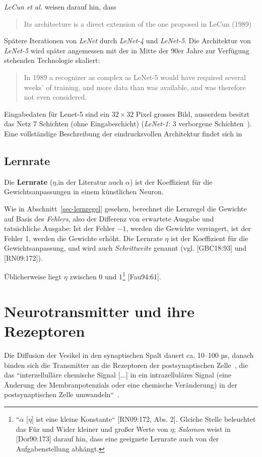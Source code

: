 {\textit{LeCun et al.} weisen darauf hin, dass

\blockquote[{\cite[544]{CBD+89}}]{
    Its architecture is a direct extension of the one proposed in LeCun (1989)
}
\noindent
Spätere Iterationen von \textit{LeNet} durch \textit{LeNet-4} und \textit{LeNet-5}. Die Architektur von \textit{LeNet-5} wird später angemessen mit der in Mitte der 90er Jahre zur Verfügung stehenden Technologie skaliert:

\blockquote[{\cite[15]{CBBH98}}]{
    In 1989 a recognizer as complex as LeNet-5 would have required several weeks' of training, and more data than was available, and was therefore not even considered.
}
\noindent
Eingabedaten für Lenet-5 sind ein $32 \times 32$ Pixel grosses Bild, ausserdem besitzt das Netz 7 Schichten (ohne Eingabeschicht) (\textit{LeNet-1}: 3 verborgene Schichten~\cite[544]{CBD+89}).
Eine vollständige Beschreibung der eindrucksvollen Architektur findet sich in\cite[7 f.]{CBBH98}

\subsection*{Lernrate}
Die \textbf{Lernrate} ($\eta$,in der Literatur auch $\alpha$) ist der Koeffizient für die Gewichtsanpassungen in einem künstlichen Neuron.

Wie in Abschnitt~\ref{sec-lernregel} gesehen, berechnet die Lernregel die Gewichte auf Basis des \textit{Fehlers}, also der Differenz von $\text{erwartete Ausgabe}$ und $\text{tatsächliche Ausgabe}$: Ist der Fehler $-1$, werden die Gewichte verringert, ist der Fehler 1, werden die Gewichte erhöht.
Die Lernrate $\eta$ ist der Koeffizient für die Gewichtsanpassung, und wird auch \textit{Schrittweite} genannt (vgl. [GBC18:93] und [RN09:172]).

Üblicherweise liegt $\eta$ zwischen $0$ und $1$\footnote{
    ``$\alpha$ [$\eta$] ist eine kleine Konstante`` [RN09:172, Abs. 2]. Gleiche Stelle beleuchtet das Für und Wider kleiner und großer Werte von $\eta$; \textit{Salomon} weist in [Dor90:173] darauf hin, dass eine geeignete Lernrate auch von der Aufgabenstellung abhängt.
} [Fau94:61].



\section{Neurotransmitter und ihre Rezeptoren}

Die Diffusion der Vesikel in den synaptischen Spalt dauert ca. 10–100 µs, danach binden sich die Transmitter an die Rezeptoren der postsynaptischen Zelle~\cite[96]{HS19a}, die das ``interzellulläre chemische Signal [...] in ein intrazelluläres Signal (eine Änderung des Membranpotenzials oder eine chemische Veränderung) in der postsynaptischen Zelle umwandeln``~\cite[123]{BCP18}.

}
